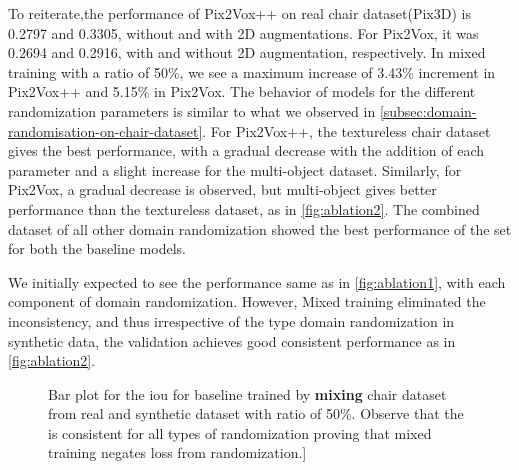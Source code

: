 To reiterate,the performance of Pix2Vox++ on real chair dataset(Pix3D) is 0.2797 and 0.3305, without and with 2D augmentations.
For Pix2Vox, it was 0.2694 and 0.2916, with and without 2D augmentation, respectively.
In mixed training with a ratio of 50\%, we see a maximum increase of 3.43\% increment in Pix2Vox++ and 5.15\% in Pix2Vox.
The behavior of models for the different randomization parameters is similar to what we observed in \autoref{subsec:domain-randomisation-on-chair-dataset}.
For Pix2Vox++, the textureless chair dataset gives the best performance, with a gradual decrease with the addition of each parameter and a slight increase for the multi-object dataset.
Similarly, for Pix2Vox, a gradual decrease is observed, but multi-object gives better performance than the textureless dataset, as in \autoref{fig:ablation2}.
The combined dataset of all other domain randomization showed the best performance of the set for both the baseline models.

We initially expected to see the performance same as in \autoref{fig:ablation1}, with each component of domain randomization.
However, Mixed training eliminated the inconsistency, and thus irrespective of the type domain randomization in synthetic data, the validation achieves good consistent performance as in \autoref{fig:ablation2}.

\begin{figure}[ht]
    \centering
    \resizebox{0.75\textwidth}{!}{}
    \caption{Bar plot for the \gls{iou}  for baseline trained by \textbf{mixing} chair dataset from real and synthetic dataset with ratio of 50\%.
    Observe that the  is consistent for all types of randomization proving that mixed training negates loss from randomization.]}
    \label{fig:ablation2}
\end{figure}


